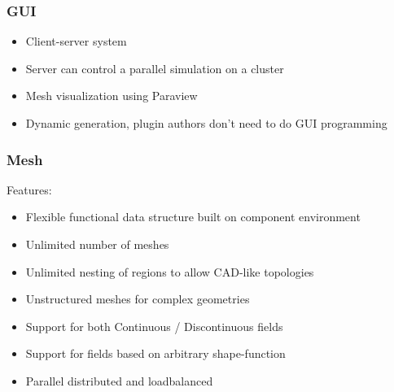 \documentclass{beamer}
\begin{document}
\begin{frame}
 \frametitle{GUI}
 \begin{itemize}
  \item Client-server system
  \item Server can control a parallel simulation on a cluster
  \item Mesh visualization using Paraview
  \item Dynamic generation, plugin authors don't need to do GUI programming
 \end{itemize}
\end{frame}


\begin{frame}
  \frametitle{Mesh}
    Features:
    \begin{itemize}
      \item Flexible functional data structure built on component environment
      \item Unlimited number of meshes
      \item Unlimited nesting of regions to allow CAD-like topologies
      \item Unstructured meshes for complex geometries
      \item Support for both Continuous / Discontinuous fields
      \item Support for fields based on arbitrary shape-function
      \item Parallel distributed and loadbalanced
    \end{itemize}
\end{frame}

\end{document}
